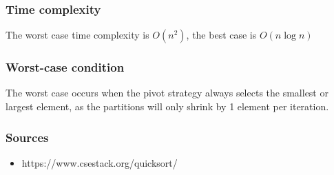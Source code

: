 \documentclass{article}
\begin{document}
\subsubsection{Time complexity}
The worst case time complexity is \(O(n^2)\), the best case is \(O(n \log n)\)
\subsubsection{Worst-case condition}
The worst case occurs when the pivot strategy always selects the smallest or largest element, as the partitions will only shrink by 1 element per iteration.
\subsubsection{Sources}
\begin{itemize}
    \item https://www.csestack.org/quicksort/
\end{itemize}
\end{document}
